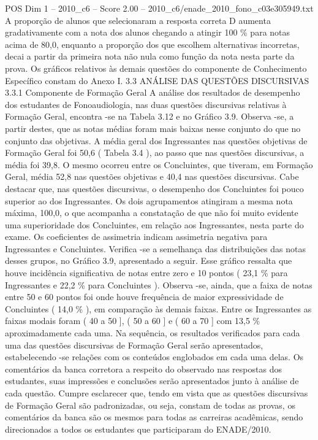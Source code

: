 \begin{textsample}{POS Dim 1 – 2010\_c6 – Score 2.00 – 2010\_c6/enade\_2010\_fono\_c03e305949.txt}
A proporção de alunos que selecionaram a resposta correta D aumenta gradativamente com a nota dos alunos chegando a atingir 100 \% para notas acima de 80,0, enquanto a proporção dos que escolhem alternativas incorretas, decai a partir da primeira nota não nula como função da nota nesta parte da prova.
Os gráficos relativos às demais questões do componente de Conhecimento Específico constam do Anexo I. 3.3 ANÁLISE DAS QUESTÕES DISCURSIVAS 3.3.1 Componente de Formação Geral A análise dos resultados de desempenho dos estudantes de Fonoaudiologia, nas duas questões discursivas relativas à Formação Geral, encontra -se na Tabela 3.12 e no Gráfico 3.9.
Observa -se, a partir destes, que as notas médias foram mais baixas nesse conjunto do que no conjunto das objetivas.
A média geral dos Ingressantes nas questões objetivas de Formação Geral foi 50,6 ( Tabela 3.4 ), ao passo que nas questões discursivas, a média foi 39,8.
O mesmo ocorreu entre os Concluintes, que tiveram, em Formação Geral, média 52,8 nas questões objetivas e 40,4 nas questões discursivas.
Cabe destacar que, nas questões discursivas, o desempenho dos Concluintes foi pouco superior ao dos Ingressantes.
Os dois agrupamentos atingiram a mesma nota máxima, 100,0, o que acompanha a constatação de que não foi muito evidente uma superioridade dos Concluintes, em relação aos Ingressantes, nesta parte do exame.
Os coeficientes de assimetria indicam assimetria negativa para Ingressantes e Concluintes.
Verifica -se a semelhança das distribuições das notas desses grupos, no Gráfico 3.9, apresentado a seguir.
Esse gráfico ressalta que houve incidência significativa de notas entre zero e 10 pontos ( 23,1 \% para Ingressantes e 22,2 \% para Concluintes ).
Observa -se, ainda, que a faixa de notas entre 50 e 60 pontos foi onde houve frequência de maior expressividade de Concluintes ( 14,0 \% ), em comparação às demais faixas.
Entre os Ingressantes as faixas modais foram ( 40 a 50 ], ( 50 a 60 ] e ( 60 a 70 ] com 13,5 \% aproximadamente cada uma.
Na sequência, os resultados verificados para cada uma das questões discursivas de Formação Geral serão apresentados, estabelecendo -se relações com os conteúdos englobados em cada uma delas.
Os comentários da banca corretora a respeito do observado nas respostas dos estudantes, suas impressões e conclusões serão apresentados junto à análise de cada questão.
Cumpre esclarecer que, tendo em vista que as questões discursivas de Formação Geral são padronizadas, ou seja, constam de todas as provas, os comentários da banca são os mesmos para todas as carreiras acadêmicas, sendo direcionados a todos os estudantes que participaram do ENADE/2010.

\end{textsample}

